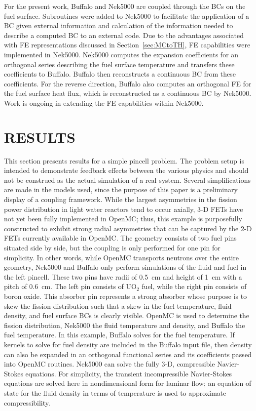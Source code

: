 \documentclass[letterpaper]{physor2018}
\begin{document}
For the present work, Buffalo and Nek5000 are coupled through the
BCs on the fuel surface.
Subroutines were added to Nek5000 to facilitate the application
of a BC given external information and calculation of the
information needed to describe a computed BC to an external code.
Due to the advantages associated with FE representations
discussed in Section~\ref{sec:MCtoTH}, FE capabilities were
implemented in Nek5000. Nek5000 computes the expansion coefficients for an
orthogonal series describing the fuel surface temperature
and transfers these coefficients to Buffalo.
Buffalo then reconstructs a continuous
BC from these coefficients. For the reverse direction, Buffalo also computes
an orthogonal FE for the fuel surface heat flux, which is
reconstructed as a continuous BC by Nek5000.
Work is ongoing in extending the FE capabilities within Nek5000.

\section{RESULTS}
\label{sec:Results}
This section presents results for a simple pincell problem. The problem setup
is intended to demonstrate feedback effects between the various physics and
should not be construed as the actual simulation of a real system.
Several simplifications are made in the
models used, since the purpose of this paper is a preliminary display of a
coupling framework. While the largest asymmetries in the fission power distribution
in light water reactors tend to occur
axially, 3-D FETs have not yet been fully implemented in
OpenMC; thus, this example is purposefully constructed to exhibit
strong radial asymmetries that can be captured by
the 2-D FETs currently available in OpenMC.
The geometry consists of two fuel pins situated side by side, but
the coupling is only performed for one pin for simplicity. In other words, while
OpenMC transports neutrons over the entire geometry, Nek5000 and Buffalo only
perform simulations of the fluid and fuel in the left pincell.
These two pins have radii of \SI{0.5}{\centi\meter} and height of \SI{1}{\centi\meter} with a pitch of \SI{0.6}{\centi\meter}.
The left pin consists of \(\textrm{UO}_2\) fuel,
while the right pin consists of boron oxide. This absorber pin represents a
strong absorber whose purpose is to skew the fission distribution
such that a skew in the fuel temperature,
fluid density, and fuel surface BCs is clearly visible.
OpenMC is used to determine the fission distribution, Nek5000 the fluid temperature
and density, and Buffalo the fuel temperature. In this example, Buffalo
solves for the fuel temperature. If kernels to solve for fuel density are included in
the Buffalo input file, then density can also be expanded in an orthogonal functional
series and its coefficients passed into OpenMC routines.
Nek5000 can solve the fully 3-D, compressible Navier-Stokes
equations. For simplicity, the transient incompressible Navier-Stokes equations are
solved here in nondimensional form for laminar flow; an equation of state
for the fluid density in terms of temperature is used to approximate compressibility.
\end{document}
